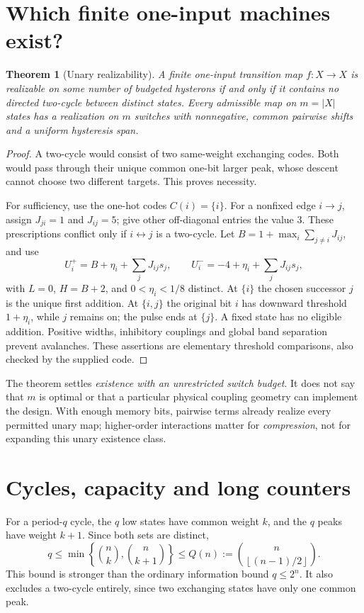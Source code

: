 \documentclass[12pt,letterpaper]{article}
\newtheorem{theorem}{Theorem}[section]
\theoremstyle{definition}\newtheorem{definition}[theorem]{Definition}
\theoremstyle{remark}\newtheorem{remark}[theorem]{Remark}
\newcommand{\floor}[1]{\left\lfloor #1\right\rfloor}
\begin{document}
\section{Which finite one-input machines exist?}\label{sec:real}
\begin{theorem}[Unary realizability]\label{thm:unary}
A finite one-input transition map $f:X\to X$ is realizable on some number of budgeted hysterons if and only if it contains no directed two-cycle between distinct states. Every admissible map on $m=|X|$ states has a realization on $m$ switches with nonnegative, common pairwise shifts and a uniform hysteresis span.
\end{theorem}
\begin{proof}
A two-cycle would consist of two same-weight exchanging codes. Both would pass through their unique common one-bit larger peak, whose descent cannot choose two different targets. This proves necessity.

For sufficiency, use the one-hot codes $C(i)=\{i\}$. For a nonfixed edge $i\to j$, assign $J_{ji}=1$ and $J_{ij}=5$; give other off-diagonal entries the value $3$. These prescriptions conflict only if $i\leftrightarrow j$ is a two-cycle. Let $B=1+\max_i\sum_{j\ne i}J_{ij}$, and use
\begin{equation}\label{eq:onehot}
 U_i^+=B+\eta_i+\sum_jJ_{ij}s_j,\qquad U_i^-=-4+\eta_i+\sum_jJ_{ij}s_j,
\end{equation}
with $L=0$, $H=B+2$, and $0<\eta_i<1/8$ distinct. At $\{i\}$ the chosen successor $j$ is the unique first addition. At $\{i,j\}$ the original bit $i$ has downward threshold $1+\eta_i$, while $j$ remains on; the pulse ends at $\{j\}$. A fixed state has no eligible addition. Positive widths, inhibitory couplings and global band separation prevent avalanches. These assertions are elementary threshold comparisons, also checked by the supplied code.
\end{proof}

The theorem settles \emph{existence with an unrestricted switch budget}. It does not say that $m$ is optimal or that a particular physical coupling geometry can implement the design. With enough memory bits, pairwise terms already realize every permitted unary map; higher-order interactions matter for \emph{compression}, not for expanding this unary existence class.

\section{Cycles, capacity and long counters}\label{sec:cycles}
For a period-$q$ cycle, the $q$ low states have common weight $k$, and the $q$ peaks have weight $k+1$. Since both sets are distinct,
\begin{equation}\label{eq:capacity}
 q\le \min\!\left\{\binom{n}{k},\binom{n}{k+1}\right\}
 \le Q(n):=\binom{n}{\floor{(n-1)/2}}.
\end{equation}
This bound is stronger than the ordinary information bound $q\le2^n$. It also excludes a two-cycle entirely, since two exchanging states have only one common peak.
\end{document}
